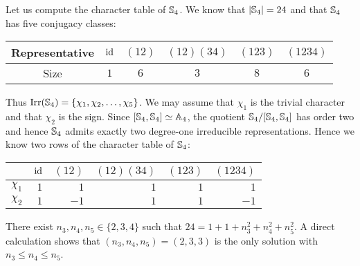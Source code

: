 \begin{example} 
Let us compute the character table of $\mathbb{S}_4$. 
We know that $|\mathbb{S}_4|=24$ and that 
$\mathbb{S}_4$ has five conjugacy classes:
	\begin{center}
		\begin{tabular}{c|ccccc}
			Representative & $\operatorname{id}$ & $(12)$ & $(12)(34)$ & $(123)$ & $(1234)$\tabularnewline
			\hline
			Size & $1$ & $6$ & $3$ & $8$ & $6$
		\end{tabular}
	\end{center}
Thus $\operatorname{Irr}(\mathbb{S}_4)=\{\chi_1,\chi_2,\dots,\chi_5\}$. We may 
assume that $\chi_1$ is the trivial character and
that $\chi_2$ is the sign. Since 
$[\mathbb{S}_4,\mathbb{S}_4]\simeq\mathbb{A}_4$, the quotient 
$\mathbb{S}_4/[\mathbb{S}_4,\mathbb{S}_4]$ has order two and hence $\mathbb{S}_4$ 
admits exactly two degree-one irreducible representations. Hence
we know two rows of the character table of $\mathbb{S}_4$: 
\bigskip 
	\begin{center}
		\begin{tabular}{|c|rrrrr|}
			\hline
			& $\operatorname{id}$ & $(12)$ & $(12)(34)$ & $(123)$ & $(1234)$\tabularnewline
			\hline
			$\chi_1$ & $1$ & $1$ & $1$ & $1$ & $1$\tabularnewline
			$\chi_2$ & $1$ & $-1$ & $1$ & $1$ & $-1$\tabularnewline
			\hline
		\end{tabular}
	\end{center}
\bigskip 
    
	There exist $n_3,n_4,n_5\in\{2,3,4\}$ such that 
	$24=1+1+n_3^2+n_4^2+n_5^2$. A direct calculation shows that $(n_3,n_4,n_5)=(2,3,3)$ is the only solution with
    $n_3\leq n_4\leq n_5$.


\end{example}
